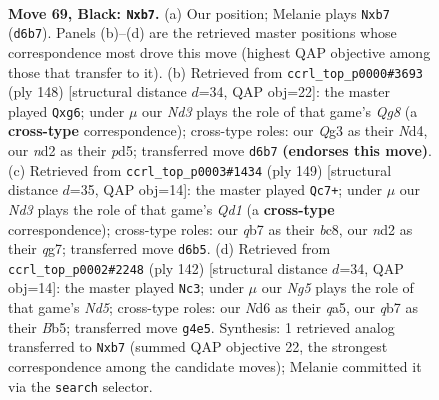 \documentclass[11pt]{article}
\begin{document}
\clearpage

\begin{figure}[p]\centering
\begin{subfigure}{0.46\textwidth}\centering
\resizebox{\linewidth}{!}{%
\newchessgame
\chessboard[
  setfen={3k4/1Q6/P2n2K1/8/6n1/6q1/3N4/8 b - - 10 69},
  showmover=false,
  pgfstyle=straightmove, color=movearrow, markmove={d6-b7}
]}
\caption{}
\end{subfigure}\hfill
\begin{subfigure}{0.46\textwidth}\centering
\resizebox{\linewidth}{!}{%
\newchessgame
\chessboard[
  setfen={6Q1/2K2p2/6q1/3p4/3N1k2/8/8/8 w - - 5 75},
  showmover=false,
  pgfstyle=straightmove, color=movearrow, markmove={g8-g6}
]}
\caption{}
\end{subfigure}
\\[4pt]
\begin{subfigure}{0.46\textwidth}\centering
\resizebox{\linewidth}{!}{%
\newchessgame
\chessboard[
  setfen={2Bq4/5KQ1/8/8/1k1n2P1/8/8/8 b - - 26 75},
  showmover=false,
  pgfstyle=straightmove, color=movearrow, markmove={d8-c7}
]}
\caption{}
\end{subfigure}\hfill
\begin{subfigure}{0.46\textwidth}\centering
\resizebox{\linewidth}{!}{%
\newchessgame
\chessboard[
  setfen={8/1p6/7k/qB1NR3/8/1K6/8/8 w - - 45 72},
  showmover=false,
  pgfstyle=straightmove, color=movearrow, markmove={d5-c3}
]}
\caption{}
\end{subfigure}
\caption{\textbf{Move 69, Black: \texttt{Nxb7}.} (a) Our position; Melanie plays \texttt{Nxb7} (\texttt{d6b7}). Panels (b)--(d) are the retrieved master positions whose correspondence most drove this move (highest QAP objective among those that transfer to it). (b) Retrieved from \texttt{ccrl\_top\_p0000\#3693} (ply 148) [structural distance $d$=34, QAP obj=22]: the master played \texttt{Qxg6}; under $\mu$ our \emph{Nd3} plays the role of that game's \emph{Qg8} (a \textbf{cross-type} correspondence); cross-type roles: our \emph{Q}g3 as their \emph{N}d4, our \emph{n}d2 as their \emph{p}d5; transferred move \texttt{d6b7} \textbf{(endorses this move)}. (c) Retrieved from \texttt{ccrl\_top\_p0003\#1434} (ply 149) [structural distance $d$=35, QAP obj=14]: the master played \texttt{Qc7+}; under $\mu$ our \emph{Nd3} plays the role of that game's \emph{Qd1} (a \textbf{cross-type} correspondence); cross-type roles: our \emph{q}b7 as their \emph{b}c8, our \emph{n}d2 as their \emph{q}g7; transferred move \texttt{d6b5}. (d) Retrieved from \texttt{ccrl\_top\_p0002\#2248} (ply 142) [structural distance $d$=34, QAP obj=14]: the master played \texttt{Nc3}; under $\mu$ our \emph{Ng5} plays the role of that game's \emph{Nd5}; cross-type roles: our \emph{N}d6 as their \emph{q}a5, our \emph{q}b7 as their \emph{B}b5; transferred move \texttt{g4e5}. Synthesis: 1 retrieved analog transferred to \texttt{Nxb7} (summed QAP objective 22, the strongest correspondence among the candidate moves); Melanie committed it via the \texttt{search} selector.}
\label{fig:thought-m137}
\end{figure}
\end{document}
